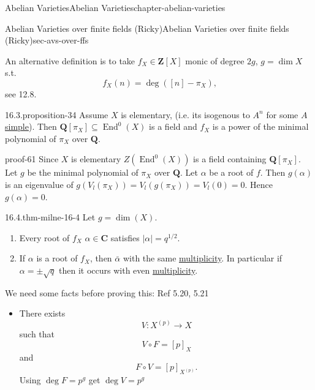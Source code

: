 \documentclass[oneside,10pt,]{book}
\numberwithin{equation}{section}
\newcommand{\lb}{[}
\newcommand{\rb}{]}
\newcommand{\ZZ}{\mathbf{Z}}
\newcommand{\QQ}{\mathbf{Q}}
\newcommand{\CC}{\mathbf{C}}
\DeclareMathOperator{\End}{End}
\begin{document}
\begin{chapterptx}{Abelian Varieties}{}{Abelian Varieties}{}{}{chapter-abelian-varieties}
\begin{sectionptx}{Abelian Varieties over finite fields (Ricky)}{}{Abelian Varieties over finite fields (Ricky)}{}{}{sec-avs-over-ffs}
\par
\hypertarget{p-362}{}%
An alternative definition is to take \(f_X\in \ZZ\lb X\rb\) monic of degree \(2g \), \(g = \dim X\) s.t.%
\begin{equation*}
f_X(n) = \deg([n] -\pi_X)\text{,}
\end{equation*}
see 12.8.%
\begin{proposition}{16.3.}{}{proposition-34}%
\hypertarget{p-363}{}%
Assume \(X\) is elementary, (i.e. its isogenous to \(A^n\) for some \(A\) \hyperref[def-simple-av]{simple}). Then  \(\QQ\lb \pi_X\rb\subseteq \End^0(X)\) is a field and \(f_X\) is a power of the minimal polynomial of \(\pi_X\) over \(\QQ\).%
\end{proposition}
\begin{proofptx}{}{proof-61}
\hypertarget{p-364}{}%
Since \(X\) is elementary \(Z(\End^0(X))\) is  a field containing \(\QQ\lb \pi_X\rb\). Let \(g\) be the minimal polynomial of \(\pi_X\) over \(\QQ\). Let \(\alpha\) be a root of \(f\). Then \(g(\alpha)\) is an eigenvalue of \(g(V_l(\pi_X)) = V_l(g(\pi_X)) = V_l(0) = 0\). Hence \(g(\alpha) = 0\).%
\end{proofptx}
\begin{theorem}{16.4.}{}{thm-milne-16-4}%
\hypertarget{p-365}{}%
Let \(g= \dim (X)\).\leavevmode%
\begin{enumerate}
\item\hypertarget{li-60}{}Every root of \(f_X\) \(\alpha \in \CC\) satisfies \(|\alpha| = q^{1/2}\).%
\item\hypertarget{li-61}{}If \(\alpha\) is  a root of \(f_X\), then \(\bar \alpha\) with the same \hyperref[def-riem-order-vanish]{multiplicity}. In particular if \(\alpha = \pm \sqrt q\) then it occurs with even \hyperref[def-riem-order-vanish]{multiplicity}.%
\end{enumerate}
%
\end{theorem}
\hypertarget{p-366}{}%
We need some facts before proving this: Ref 5.20, 5.21\leavevmode%
\begin{itemize}[label=\textbullet]
\item{}There exists%
\begin{equation*}
V\colon X^{(p)} \to X
\end{equation*}
such that%
\begin{equation*}
V\circ F = [p]_X
\end{equation*}
and%
\begin{equation*}
F \circ V = [p]_{X^{(p)}}\text{.}
\end{equation*}
Using \(\deg F = p^g \)  get \(\deg V = p^g\)%

\end{itemize}
\end{sectionptx}
\end{chapterptx}
\end{document}

